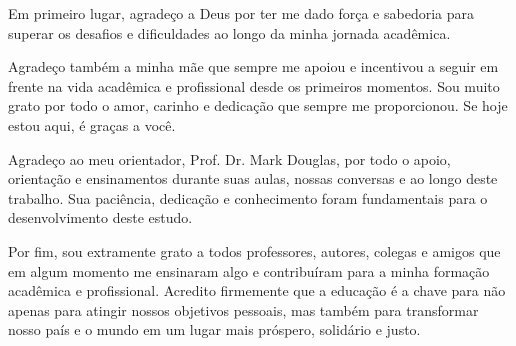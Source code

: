
\begin{agradecimentos}

Em primeiro lugar, agradeço a Deus por ter me dado força e sabedoria para superar os desafios e dificuldades ao longo da minha jornada acadêmica.

Agradeço também a minha mãe que sempre me apoiou e incentivou a seguir em frente na vida acadêmica e profissional desde os primeiros momentos. Sou muito grato por todo o amor, carinho e dedicação que sempre me proporcionou. Se hoje estou aqui, é graças a você.

Agradeço ao meu orientador, Prof. Dr. Mark Douglas, por todo o apoio, orientação e ensinamentos durante suas aulas, nossas conversas e ao longo deste trabalho. Sua paciência, dedicação e conhecimento foram fundamentais para o desenvolvimento deste estudo.

Por fim, sou extramente grato a todos professores, autores, colegas e amigos que em algum momento me ensinaram algo e contribuíram para a minha formação acadêmica e profissional. Acredito firmemente que a educação é a chave para não apenas para atingir nossos objetivos pessoais, mas também para transformar nosso país e o mundo em um lugar mais próspero, solidário e justo. 

\end{agradecimentos}


